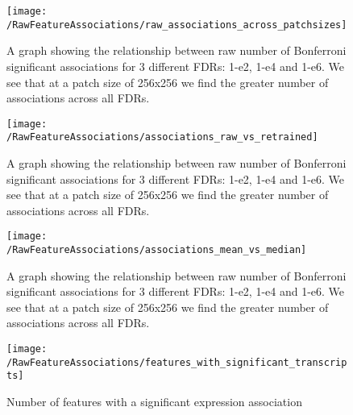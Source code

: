 \documentclass[graybox]{svmult}
\begin{document}
\begin{figure}[H]
\centering
\texttt{[image: /RawFeatureAssociations/raw\_associations\_across\_patchsizes]}
\caption{A graph showing the relationship between raw number of Bonferroni significant associations for 3 different FDRs: 1-e2, 1-e4 and 1-e6. We see that at a patch size of 256x256 we find the greater number of associations across all FDRs.}
\label{fig:raw_associations_across_patchsizes}
\end{figure}

\begin{figure}[H]
\centering
\texttt{[image: /RawFeatureAssociations/associations\_raw\_vs\_retrained]}
\caption{A graph showing the relationship between raw number of Bonferroni significant associations for 3 different FDRs: 1-e2, 1-e4 and 1-e6. We see that at a patch size of 256x256 we find the greater number of associations across all FDRs.}
\label{fig:associations_raw_vs_retrained}
\end{figure}

\begin{figure}[H]
\centering
\texttt{[image: /RawFeatureAssociations/associations\_mean\_vs\_median]}
\caption{A graph showing the relationship between raw number of Bonferroni significant associations for 3 different FDRs: 1-e2, 1-e4 and 1-e6. We see that at a patch size of 256x256 we find the greater number of associations across all FDRs.}
\label{fig:associations_mean_vs_median}
\end{figure}




\begin{figure}[H]
\centering
\texttt{[image: /RawFeatureAssociations/features\_with\_significant\_transcripts]} 
\caption{Number of features with a significant expression association}
\label{fig:features_with_significant_transcripts}
\end{figure}
\end{document}
